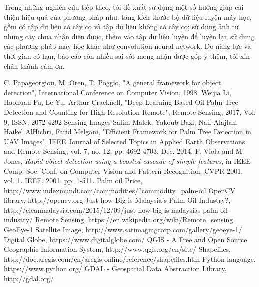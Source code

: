 \documentclass[14pt, oneside, a4paper, openany]{scrartcl}
\begin{document}
Trong những nghiên cứu tiếp theo, tôi đề xuất sử dụng một số hướng giúp cải thiện hiệu quả của phương pháp như: tăng kích thước bộ dữ liệu luyện máy học, gồm có tập dữ liệu có cây cọ và tập dữ liệu không có cây cọ; sử dụng ảnh từ những cây chưa nhận diện được, thêm vào tập dữ liệu luyện để luyện lại; sử dụng các phương pháp máy học khác như convolution neural network.
Do năng lực và thời gian có hạn, báo cáo còn nhiều sai sót mong nhận được góp ý thêm, tôi xin chân thành cảm ơn.
\newpage
\printindex
\newpage
\begin{thebibliography}{9}
	C. Papageorgiou, M. Oren, T. Poggio, 
	"A general framework for object detection",
	International Conference on Computer Vision, 1998.
	Weijia Li, Haohuan Fu, Le Yu, Arthur Cracknell,
	"Deep Learning Based Oil Palm Tree Detection and Counting for High-Resolution Remote",
	Remote Sensing, 2017, Vol. 9, ISSN: 2072-4292
	Sensing Images
	Salim Malek, Yakoub Bazi, Naif Alajlan, Haikel AlHichri, Farid Melgani,
	"Efficient Framework for Palm Tree Detection in UAV Images",
	IEEE Journal of Selected Topics in Applied Earth Observations and Remote Sensing, vol. 7, no. 12, pp. 4692-4703, Dec. 2014.
	P. Viola and M. Jones,
	\textit{Rapid object detection using a boosted cascade of simple features},
	in IEEE Comp. Soc. Conf. on Computer Vision and Pattern Recognition. CVPR 2001, vol. 1. IEEE, 2001, pp. 1-511.
	Palm oil Price, http://www.indexmundi.com/commodities/?commodity=palm-oil
	OpenCV library, http://opencv.org
	Just how Big is Malaysia’s Palm Oil Industry?, http://cleanmalaysia.com/2015/12/09/just-how-big-is-malaysias-palm-oil-industry/
	Remote Sensing, https://en.wikipedia.org/wiki/Remote\_sensing
	GeoEye-1 Satellite Image, http://www.satimagingcorp.com/gallery/geoeye-1/
	Digital Globe, https://www.digitalglobe.com/
	QGIS - A Free and Open Source Geographic Information System, http://www.qgis.org/en/site/
	Shapefiles, http://doc.arcgis.com/en/arcgis-online/reference/shapefiles.htm
	Python language, https://www.python.org/
	GDAL - Geospatial Data Abstraction Library, http://gdal.org/
\end{thebibliography}
\end{document}
